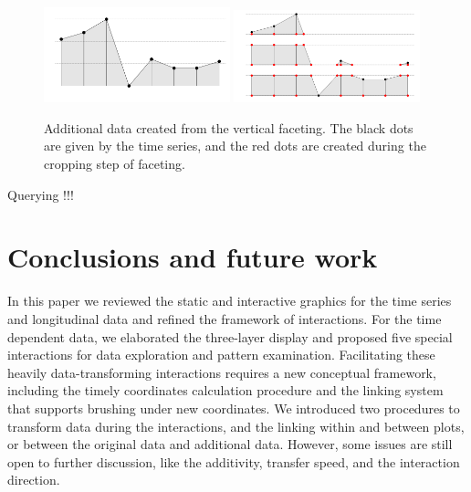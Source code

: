 \documentclass[12pt]{article}
\newcommand{\red}[1]{{\color{red} #1}}
\begin{document}
\begin{itemize}
\begin{center}
\begin{figure}[htp]
\begin{centering}
\includegraphics[width=0.48\textwidth]{graph/pipeline-23-1}
\includegraphics[width=0.48\textwidth]{graph/pipeline-23-2}
\end{centering}
\caption{\label{fig:Additional-data}Additional data created from the vertical
faceting. The black dots are given by the time series, and the red
dots are created during the cropping step of faceting.}
\end{figure}
\end{center}

\end{itemize}

\red{Querying !!!}

\section{Conclusions and future work}

In this paper we reviewed the static and interactive graphics for
the time series and longitudinal data and refined the framework of
interactions. For the time dependent data, we elaborated the
three-layer display and proposed five special interactions for data
exploration and pattern examination. Facilitating these heavily
data-transforming interactions requires a new conceptual framework,
including the timely coordinates calculation procedure and
the linking system that supports brushing under new coordinates.
We introduced two procedures to transform data during the
interactions, and the linking within and between plots, or
between the original data and additional data.
However, some issues are still open to further discussion,
like the additivity, transfer speed, and the interaction direction.
\end{document}
